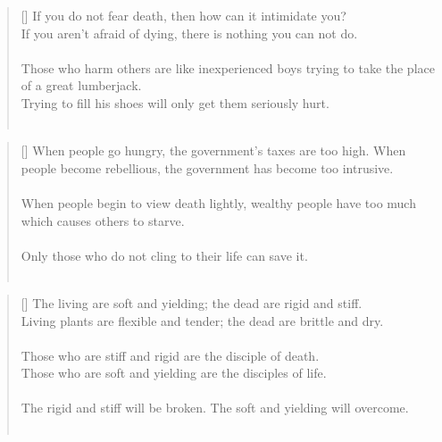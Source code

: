 \documentclass{article}
\begin{document}
\settowidth{\versewidth}{The Wizard leads byemptying people’s minds, filling their bellies, weakening their am- bitions, and making them become strong}
\begin{verse}[\versewidth]
If you do not fear death, then how can it intimidate you?\\
If you aren't afraid of dying, there is nothing you can not do.\\
\hfill\\
Those who harm others are like inexperienced boys trying to take the place of a great lumberjack.\\
Trying to fill his shoes will only get them seriously hurt.\\
\hfill\\
\end{verse}

\settowidth{\versewidth}{The Wizard leads byemptying people’s minds, filling their bellies, weakening their am- bitions, and making them become strong}
\begin{verse}[\versewidth]
When people go hungry, the government's taxes are too high. 
When people become rebellious, the government has become too intrusive.\\
\hfill\\
When people begin to view death lightly, wealthy people have too much which causes others to starve.\\
\hfill\\
Only those who do not cling to their life can save it.\\
\hfill\\
\end{verse}

\settowidth{\versewidth}{The Wizard leads byemptying people’s minds, filling their bellies, weakening their am- bitions, and making them become strong}
\begin{verse}[\versewidth]
The living are soft and yielding; the dead are rigid and stiff.\\
Living plants are flexible and tender; the dead are brittle and dry.\\
\hfill\\
Those who are stiff and rigid are the disciple of death.\\
Those who are soft and yielding are the disciples of life.\\
\hfill\\
The rigid and stiff will be broken. 
The soft and yielding will overcome.\\
\hfill\\
\end{verse}
\end{document}
